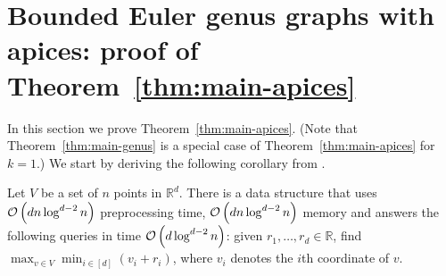 \section{Bounded Euler genus graphs with apices: proof of Theorem~\ref{thm:main-apices}}\label{sec:algo-genus}

In this section we prove Theorem~\ref{thm:main-apices}.
(Note that Theorem~\ref{thm:main-genus} is a special case of Theorem~\ref{thm:main-apices}
 for $k=1$.)
We start by deriving the following corollary from .

\begin{corollary}\label{l:max_min_query}
Let $V$ be a set of $n$ points in $\mathbb{R}^d$.
There is a data structure that uses $\mathcal{O} \left( d n \log^{d - 2} n \right)$ preprocessing time, $\mathcal{O} \left( d n \log^{d - 2} n \right)$ memory and answers the following queries in time $\mathcal{O} \left( d \log^{d - 2} n \right)$: given $r_1, \dots, r_d \in \mathbb{R}$, find $\max_{v \in V} \min_{i \in [d]} (v_i + r_i)$, where $v_i$ denotes the $i$th coordinate of $v$.
\end{corollary}

